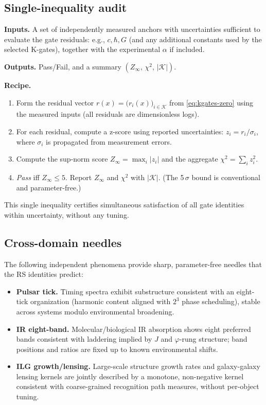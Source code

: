 \documentclass[11pt]{article}
\begin{document}
\subsection{Single\mbox{-}inequality audit}
\textbf{Inputs.} A set of independently measured anchors with uncertainties sufficient to evaluate the gate residuals: e.g., \(c,\hbar,G\) (and any additional constants used by the selected K\mbox{-}gates), together with the experimental \(\alpha\) if included.

\textbf{Outputs.} Pass/Fail, and a summary \((Z_\infty,\, \chi^2,\, |\mathcal{K}|)\).

\textbf{Recipe.}
\begin{enumerate}
  \item Form the residual vector \(r(x)=\bigl(r_i(x)\bigr)_{i\in\mathcal{K}}\) from \eqref{eq:kgates-zero} using the measured inputs (all residuals are dimensionless logs).
  \item For each residual, compute a z\mbox{-}score using reported uncertainties: \(z_i = r_i/\sigma_i\), where \(\sigma_i\) is propagated from measurement errors.
  \item Compute the sup\mbox{-}norm score \(Z_\infty=\max_i |z_i|\) and the aggregate \(\chi^2=\sum_i z_i^2\).
  \item \emph{Pass} iff \(Z_\infty \le 5\). Report \(Z_\infty\) and \(\chi^2\) with \(|\mathcal{K}|\). (The 5\,\(\sigma\) bound is conventional and parameter\mbox{-}free.)
\end{enumerate}
This single inequality certifies simultaneous satisfaction of all gate identities within uncertainty, without any tuning.

\subsection{Cross\mbox{-}domain needles}
The following independent phenomena provide sharp, parameter\mbox{-}free needles that the RS identities predict:
\begin{itemize}
  \item \textbf{Pulsar tick.} Timing spectra exhibit substructure consistent with an eight\mbox{-}tick organization (harmonic content aligned with \(2^3\) phase scheduling), stable across systems modulo environmental broadening.
  \item \textbf{IR eight\mbox{-}band.} Molecular/biological IR absorption shows eight preferred bands consistent with laddering implied by \(J\) and \(\varphi\)\mbox{-}rung structure; band positions and ratios are fixed up to known environmental shifts.
  \item \textbf{ILG growth/lensing.} Large\mbox{-}scale structure growth rates and galaxy\mbox{-}galaxy lensing kernels are jointly described by a monotone, non\mbox{-}negative kernel consistent with coarse\mbox{-}grained recognition path measures, without per\mbox{-}object tuning.
\end{itemize}
\end{document}
